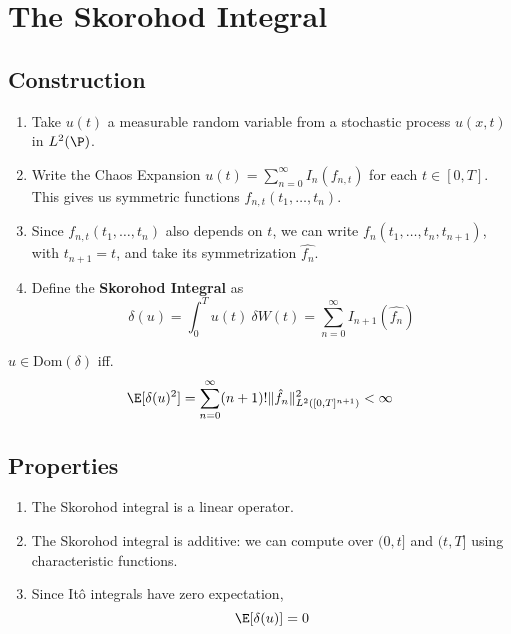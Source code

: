 \chapter{The Skorohod Integral}

\section{Construction}

\begin{enumerate}
\item Take $u(t)$ a measurable random variable from a stochastic process $u(x,t)$ in $L^2(\P)$.

\item Write the Chaos Expansion $u(t) = \sum_{n=0}^\infty I_{n}(f_{n,t})$ for each $t \in [0,T]$. This gives us symmetric functions $f_{n,t}(t_1, \ldots, t_n)$.

\item Since $f_{n,t}(t_1, \ldots, t_n)$ also depends on $t$, we can write $f_n(t_1, \ldots, t_n, t_{n+1})$, with $t_{n+1} = t$, and take its symmetrization $\hat{f_n}$.

\item Define the \textbf{Skorohod Integral} as
$$
\delta(u) = \int_0^T u(t)~\delta W(t) = \sum_{n=0}^\infty I_{n+1}(\hat{f_n})
$$
\end{enumerate}


\begin{remark}\label{rmk:202309060706}
$u \in \text{Dom}(\delta)$ iff. 
$$
\E[\delta(u)^2] = \sum_{n=0}^\infty (n+1)! \| \hat{f}_n \|_{L^2([0,T]^{n+1})}^2 < \infty
$$
\end{remark}

\section{Properties}

\begin{enumerate}
\item The Skorohod integral is a linear operator.
\item The Skorohod integral is additive: we can compute over $(0,t]$ and $(t, T]$ using characteristic functions.
\item Since Itô integrals have zero expectation, $$ \E[\delta(u)] = 0 $$
\end{enumerate}

